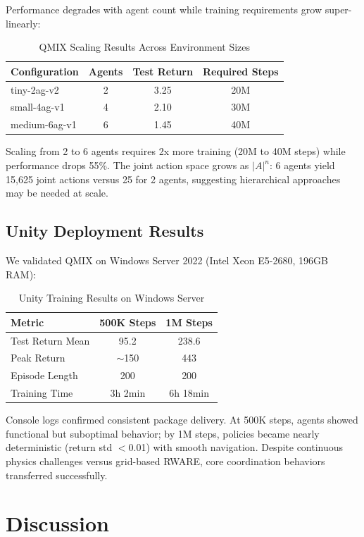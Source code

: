 \documentclass[11pt]{article}
\begin{document}
Performance degrades with agent count while training requirements grow super-linearly:

\begin{table}[H]
\centering
\small
\caption{QMIX Scaling Results Across Environment Sizes}
\begin{tabular}{lccc}
\toprule
Configuration & Agents & Test Return & Required Steps \\
\midrule
tiny-2ag-v2 & 2 & 3.25 & 20M \\
small-4ag-v1 & 4 & 2.10 & 30M \\
medium-6ag-v1 & 6 & 1.45 & 40M \\
\bottomrule
\end{tabular}
\end{table}

Scaling from 2 to 6 agents requires 2x more training (20M to 40M steps) while performance drops 55\%. The joint action space grows as $|A|^n$: 6 agents yield 15,625 joint actions versus 25 for 2 agents, suggesting hierarchical approaches may be needed at scale.

\subsection{Unity Deployment Results}

We validated QMIX on Windows Server 2022 (Intel Xeon E5-2680, 196GB RAM):

\begin{table}[H]
\centering
\small
\caption{Unity Training Results on Windows Server}
\begin{tabular}{lcc}
\toprule
Metric & 500K Steps & 1M Steps \\
\midrule
Test Return Mean & 95.2 & 238.6 \\
Peak Return & $\sim$150 & 443 \\
Episode Length & 200 & 200 \\
Training Time & 3h 2min & 6h 18min \\
\bottomrule
\end{tabular}
\end{table}

Console logs confirmed consistent package delivery. At 500K steps, agents showed functional but suboptimal behavior; by 1M steps, policies became nearly deterministic (return std $<$0.01) with smooth navigation. Despite continuous physics challenges versus grid-based RWARE, core coordination behaviors transferred successfully.

\section{Discussion}
\end{document}
